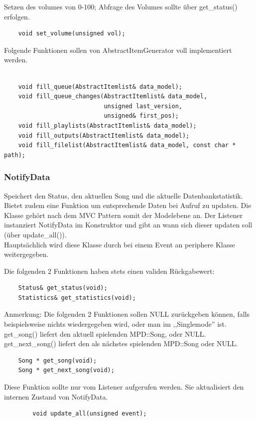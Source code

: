 Setzen des volumes von 0-100; Abfrage des Volumes sollte über get\_status() erfolgen.
\begin{verbatim}
    void set_volume(unsigned vol);
\end{verbatim}

Folgende Funktionen sollen von AbstractItemGenerator voll implementiert werden.    
\begin{verbatim}

    void fill_queue(AbstractItemlist& data_model);
    void fill_queue_changes(AbstractItemlist& data_model,
                            unsigned last_version,
                            unsigned& first_pos);
    void fill_playlists(AbstractItemlist& data_model);
    void fill_outputs(AbstractItemlist& data_model);
    void fill_filelist(AbstractItemlist& data_model, const char * path);
\end{verbatim}

\subsubsection{NotifyData}
Speichert den Status, den aktuellen Song und die aktuelle Datenbankstatistik.
Bietet zudem eine Funktion um entsprechende Daten bei Aufruf zu updaten.
Die Klasse gehört nach dem MVC Pattern somit der Modelebene an.
Der Listener instanziert NotifyData im Konstruktor und gibt an wann sich dieser updaten soll (über update\_all()).
\\        
Hauptsächlich wird diese Klasse durch bei einem Event an periphere Klasse weitergegeben.
      
Die folgenden 2 Funktionen haben stets einen validen Rückgabewert:
\begin{verbatim}
    Status& get_status(void);
    Statistics& get_statistics(void);
\end{verbatim}

Anmerkung: Die folgenden 2 Funktionen sollen NULL zurückgeben können, falls beispielsweise
nichts wiedergegeben wird, oder man im ,,Singlemode'' ist.
get\_song() liefert den aktuell spielenden MPD::Song, oder NULL.
get\_next\_song() liefert den als nächstes spielenden MPD::Song oder NULL.
\begin{verbatim} 
    Song * get_song(void);
    Song * get_next_song(void);
\end{verbatim}

Diese Funktion sollte nur vom Listener aufgerufen werden. Sie aktualisiert den internen Zustand
von NotifyData.
\begin{verbatim}
        void update_all(unsigned event);
\end{verbatim}


